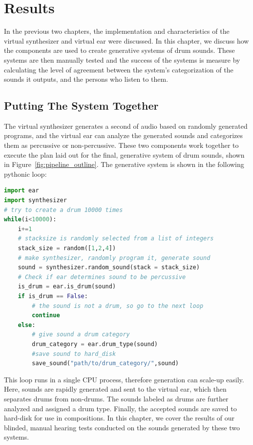 \documentclass[\main/thesis.tex]{subfiles}
\begin{document}
\chapter{Results}
In the previous two chapters, the implementation and characteristics of the virtual synthesizer and virtual ear were discussed. In this chapter, we discuss how the components are used to create generative systems of drum sounds. These systems are then manually tested and the success of the systems is measure by calculating the level of agreement between the system's categorization of the sounds it outputs, and the persons who listen to them. 
\newcommand{\decfirst}{\textit{Decision.1}}
\newcommand{\decsecond}{\textit{Decision.2}}
\section{Putting The System Together}
 The virtual synthesizer generates a second of audio based on randomly generated programs, and the virtual ear can analyze the generated sounds and categorizes them as percussive or non-percussive. These two components work together to execute the plan laid out for the final, generative system of drum sounds, shown in Figure~\ref{fig:pipeline_outline}. The generative system is shown in the following pythonic loop:
\begin{lstlisting}[language=Python]
import ear
import synthesizer
# try to create a drum 10000 times
while(i<10000):
    i+=1
    # stacksize is randomly selected from a list of integers
    stack_size = random([1,2,4])
    # make synthesizer, randomly program it, generate sound
    sound = synthesizer.random_sound(stack = stack_size)
    # Check if ear determines sound to be percussive
    is_drum = ear.is_drum(sound)
    if is_drum == False:
        # the sound is not a drum, so go to the next loop
        continue 
    else:
        # give sound a drum category 
        drum_category = ear.drum_type(sound) 
        #save sound to hard_disk
        save_sound("path/to/drum_category/",sound) 
\end{lstlisting}
This loop runs in a single CPU process, therefore generation can scale-up easily. Here, sounds are rapidly generated and sent to the virtual ear, which then separates drums from non-drums. The sounds labeled as drums are further analyzed and assigned a drum type. Finally, the accepted sounds are saved to hard-disk for use in compositions. In this chapter, we cover the results of our blinded, manual hearing tests conducted on the sounds generated by these two systems.
\end{document}
